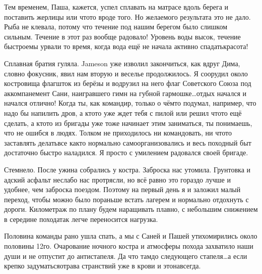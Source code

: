 Тем временем, Паша, кажется, успел сплавать на матрасе вдоль берега и поставить жерлицы или что\sdash то вроде того. Но желаемого результата это не дало. Рыба не клевала, потому что течение под нашим берегом было слишком сильным. Течение в этот раз вообще радовало! Уровень воды высок, течение быстрое\mdash мы урвали то время, когда вода ещё не начала активно спадать\mdash кра\sdash со\sdash та!
 
Сплавная братия гуляла. Jameson уже изволил закончиться, как вдруг Дима, словно фокусник, явил нам вторую и веселье продолжилось. Я соорудил около костровища флагшток из берёзы и водрузил на него флаг Советского Союза под аккомпанемент Сани, наигравшего гимн на губной гармошке\ldots отдых начался и начался отлично! Когда ты, как командир, только о чём\sdash то подумал, например, что надо бы напилить дров, а кто\sdash то уже ждет тебя с пилой или решил что\sdash то ещё сделать, а кто\sdash то из бригады уже тоже начинает этим заниматься, ты понимаешь, что не ошибся в людях. Толком не приходилось ни командовать, ни что\sdash то заставлять делать\mdash все как\sdash то нормально самоорганизовались и весь походный быт достаточно быстро наладился. Я просто с умилением радовался своей бригаде.

Стемнело. После ужина собрались у костра. Заброска нас утомила. Грунтовка и адский асфальт неслабо нас протрясли, но всё равно это гораздо лучше и удобнее, чем заброска поездом. Поэтому на первый день я и заложил малый переход, чтобы можно было пораньше встать лагерем и нормально отдохнуть с дороги. Километраж по плану будем наращивать плавно, с небольшим снижением в середине похода\mdash так легче переносится нагрузка.

Половина команды рано ушла спать, а мы с Саней и Пашей утихомирились около половины 12\sdash го. Очарование ночного костра и атмосферы похода захватило наши души и не отпустит до антистапеля. Да что там\mdash до следующего стапеля\ldots а если крепко задуматься\mdash отрава странствий уже в крови и это\mdash навсегда.

\begin{center}
\end{center}
